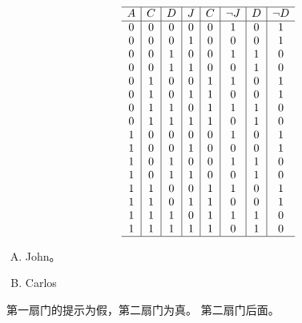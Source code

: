 {{        %
        \begin{practices}
            \begin{table}[H]
                \[
                    \begin{array}{c|c|c|c|c|c|c|c}
                        \hline
                        A & C & D & J & C & \neg J & D & \neg D \\
                        \hline
                        0 & 0 & 0 & 0 & 0 & 1 & 0 & 1 \\
                        0 & 0 & 0 & 1 & 0 & 0 & 0 & 1 \\
                        0 & 0 & 1 & 0 & 0 & 1 & 1 & 0 \\
                        0 & 0 & 1 & 1 & 0 & 0 & 1 & 0 \\
                        0 & 1 & 0 & 0 & 1 & 1 & 0 & 1 \\
                        0 & 1 & 0 & 1 & 1 & 0 & 0 & 1 \\
                        0 & 1 & 1 & 0 & 1 & 1 & 1 & 0 \\
                        0 & 1 & 1 & 1 & 1 & 0 & 1 & 0 \\
                        1 & 0 & 0 & 0 & 0 & 1 & 0 & 1 \\
                        1 & 0 & 0 & 1 & 0 & 0 & 0 & 1 \\
                        1 & 0 & 1 & 0 & 0 & 1 & 1 & 0 \\
                        1 & 0 & 1 & 1 & 0 & 0 & 1 & 0 \\
                        1 & 1 & 0 & 0 & 1 & 1 & 0 & 1 \\
                        1 & 1 & 0 & 1 & 1 & 0 & 0 & 1 \\
                        1 & 1 & 1 & 0 & 1 & 1 & 1 & 0 \\
                        1 & 1 & 1 & 1 & 1 & 0 & 1 & 0 \\
                        \hline
                   \end{array}
               \]
            \end{table}

            \begin{enumerate}[A.]
                \item John。
                \item Carlos
            \end{enumerate}
        \end{practices}

        \begin{practices}
            第一扇门的提示为假，第二扇门为真。
            第二扇门后面。
        \end{practices}
    }
}
